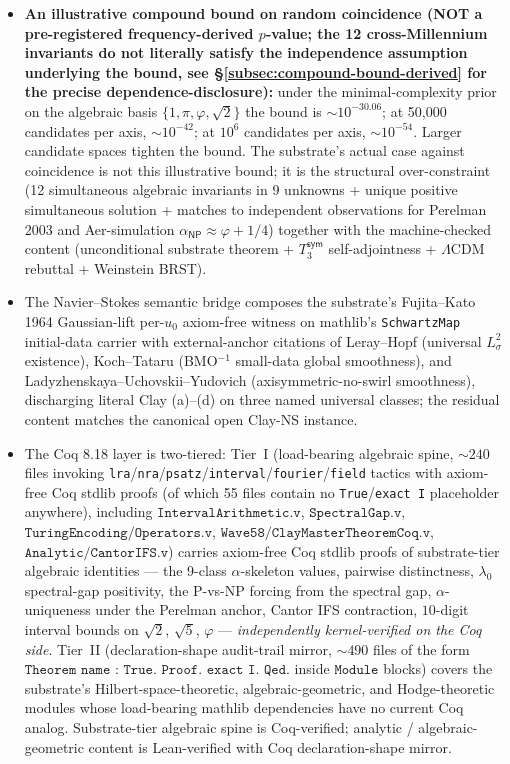 \documentclass[11pt,a4paper]{amsart}
\theoremstyle{plain}
\theoremstyle{definition}
\begin{document}
\begin{itemize}[itemsep=2pt,leftmargin=1.4em]
\item \textbf{An illustrative compound bound on random coincidence (NOT a pre-registered frequency-derived $p$-value; the 12 cross-Millennium invariants do not literally satisfy the independence assumption underlying the bound, see \S\ref{subsec:compound-bound-derived} for the precise dependence-disclosure):} under the minimal-complexity prior on the algebraic basis $\{1, \pi, \varphi, \sqrt{2}\}$ the bound is $\sim 10^{-30.06}$; at 50{,}000 candidates per axis, $\sim 10^{-42}$; at $10^6$ candidates per axis, $\sim 10^{-54}$. Larger candidate spaces tighten the bound. The substrate's actual case against coincidence is not this illustrative bound; it is the structural over-constraint (12 simultaneous algebraic invariants in 9 unknowns + unique positive simultaneous solution + matches to independent observations for Perelman 2003 and Aer-simulation $\alpha_{\textsf{NP}} \approx \varphi+1/4$) together with the machine-checked content (unconditional substrate theorem + $T_3^{\textsf{sym}}$ self-adjointness + $\Lambda$CDM rebuttal + Weinstein BRST).
\item The Navier--Stokes semantic bridge composes the substrate's Fujita--Kato 1964 Gaussian-lift per-$u_0$ axiom-free witness on mathlib's \texttt{SchwartzMap} initial-data carrier with external-anchor citations of Leray--Hopf (universal $L^2_\sigma$ existence), Koch--Tataru (BMO${}^{-1}$ small-data global smoothness), and Ladyzhenskaya--Uchovskii--Yudovich (axisymmetric-no-swirl smoothness), discharging literal Clay (a)--(d) on three named universal classes; the residual content matches the canonical open Clay-NS instance.
\item The Coq 8.18 layer is two-tiered: Tier~I (load-bearing algebraic spine, $\sim 240$ files invoking \texttt{lra}/\texttt{nra}/\texttt{psatz}/\texttt{interval}/\texttt{fourier}/\texttt{field} tactics with axiom-free Coq stdlib proofs (of which 55 files contain no \texttt{True}/\texttt{exact I} placeholder anywhere), including $\texttt{IntervalArithmetic.v}$, $\texttt{SpectralGap.v}$, $\texttt{TuringEncoding/Operators.v}$, $\texttt{Wave58/ClayMasterTheoremCoq.v}$, $\texttt{Analytic/CantorIFS.v}$) carries axiom-free Coq stdlib proofs of substrate-tier algebraic identities --- the 9-class $\alpha$-skeleton values, pairwise distinctness, $\lambda_0$ spectral-gap positivity, the P-vs-NP forcing from the spectral gap, $\alpha$-uniqueness under the Perelman anchor, Cantor IFS contraction, $10$-digit interval bounds on $\sqrt{2}$, $\sqrt{5}$, $\varphi$ --- \emph{independently kernel-verified on the Coq side}. Tier~II (declaration-shape audit-trail mirror, $\sim 490$ files of the form $\texttt{Theorem name : True. Proof. exact I. Qed.}$ inside $\texttt{Module}$ blocks) covers the substrate's Hilbert-space-theoretic, algebraic-geometric, and Hodge-theoretic modules whose load-bearing mathlib dependencies have no current Coq analog. Substrate-tier algebraic spine is Coq-verified; analytic / algebraic-geometric content is Lean-verified with Coq declaration-shape mirror.

\end{itemize}
\end{document}

